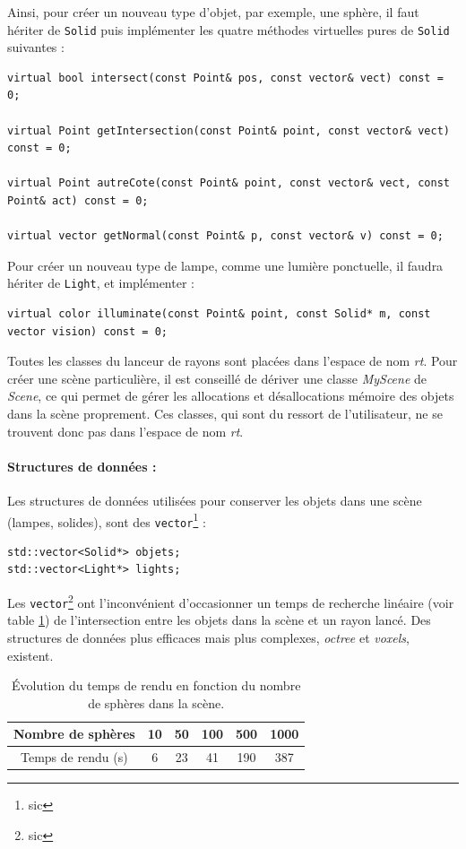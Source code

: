 Ainsi, pour créer un nouveau type d'objet, par exemple, une sphère, il faut hériter de \verb|Solid| puis implémenter les quatre méthodes virtuelles 
pures de \verb|Solid| suivantes :

\begin{lstlisting}
virtual bool intersect(const Point& pos, const vector& vect) const = 0;

virtual Point getIntersection(const Point& point, const vector& vect) const = 0;

virtual Point autreCote(const Point& point, const vector& vect,	const Point& act) const = 0;

virtual vector getNormal(const Point& p, const vector& v) const = 0;
\end{lstlisting}

Pour créer un nouveau type de lampe, comme une lumière ponctuelle, il faudra hériter de \verb|Light|, et implémenter :
\begin{lstlisting}
virtual color illuminate(const Point& point, const Solid* m, const vector vision) const = 0;
\end{lstlisting}

Toutes les classes du lanceur de rayons sont placées dans l'espace de nom \emph{rt}. Pour créer une scène particulière, il est
conseillé de dériver une classe \emph{MyScene}  de \emph{Scene}, ce qui permet de gérer les allocations et désallocations 
mémoire des objets dans la scène proprement. Ces classes, qui sont du ressort de l'utilisateur, ne se trouvent donc pas dans l'espace
 de nom \emph{rt}.

\paragraph{Structures de données : }
Les structures de données utilisées pour conserver les objets dans une scène (lampes, solides), sont des \verb|vector|\footnote{sic} : 
\begin{lstlisting}
std::vector<Solid*> objets;
std::vector<Light*> lights;
\end{lstlisting}
Les \verb|vector|\footnote{sic} ont l'inconvénient d'occasionner un temps de recherche linéaire (voir table \ref{tempsSphères}) de l'intersection entre les objets dans la scène et un rayon lancé. 
Des structures de données plus efficaces mais plus complexes, \emph{octree} et \emph{voxels}, existent.

\begin{table}
\begin{center}
\begin{tabular}{|c|c|c|c|c|c|}
\hline 
Nombre de sphères & 10 & 50 & 100 & 500 & 1000 \\ 
\hline 
Temps de rendu (s) & 6 & 23 & 41 & 190 & 387 \\ 
\hline 
\end{tabular} 
\end{center}
\caption{Évolution du temps de rendu en fonction du nombre de sphères dans la scène.} \label{tempsSphères}
\end{table}